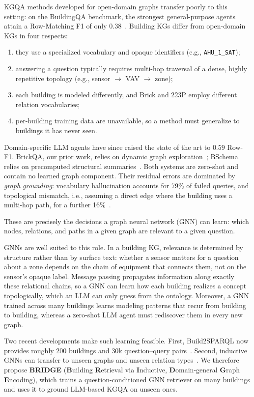 \documentclass[11pt]{article}
\newcommand{\code}[1]{\texttt{#1}}
\begin{document}
KGQA methods developed for open-domain graphs transfer poorly to this setting: on the BuildingQA benchmark, the strongest general-purpose agents attain a Row-Matching F1 of only $0.38$~\cite{mulayim2025buildingqa}. Building KGs differ from open-domain KGs in four respects:
\begin{enumerate}
  \item they use a specialized vocabulary and opaque identifiers (e.g., \code{AHU\_1\_SAT});
  \item answering a question typically requires multi-hop traversal of a dense, highly repetitive topology (e.g., sensor $\rightarrow$ VAV $\rightarrow$ zone);
  \item each building is modeled differently, and Brick and 223P employ different relation vocabularies;
  \item per-building training data are unavailable, so a method must generalize to buildings it has never seen.
\end{enumerate}

Domain-specific LLM agents have since raised the state of the art to $0.59$ Row-F1. BrickQA, our prior work, relies on dynamic graph exploration~\cite{ko2026brickqa}; BSchema relies on precomputed structural summaries~\cite{bschema2026}. Both systems are zero-shot and contain no learned graph component. Their residual errors are dominated by \emph{graph grounding}: vocabulary hallucination accounts for 79\% of failed queries, and topological mismatch, i.e., assuming a direct edge where the building uses a multi-hop path, for a further 16\%~\cite{bschema2026}.

These are precisely the decisions a graph neural network (GNN) can learn: which nodes, relations, and paths in a given graph are relevant to a given question.

GNNs are well suited to this role. In a building KG, relevance is determined by structure rather than by surface text: whether a sensor matters for a question about a zone depends on the chain of equipment that connects them, not on the sensor's opaque label. Message passing propagates information along exactly these relational chains, so a GNN can learn how each building realizes a concept topologically, which an LLM can only guess from the ontology. Moreover, a GNN trained across many buildings learns modeling patterns that recur from building to building, whereas a zero-shot LLM agent must rediscover them in every new graph.

Two recent developments make such learning feasible. First, Build2SPARQL now provides roughly 200 buildings and 30k question--query pairs~\cite{jung2026build2sparql}. Second, inductive GNNs can transfer to unseen graphs and unseen relation types~\cite{zhu2021nbfnet,galkin2024ultra}. We therefore propose \textbf{BRIDGE} (\textbf{B}uilding \textbf{R}etrieval via \textbf{I}nductive, \textbf{D}omain-general \textbf{G}raph \textbf{E}ncoding), which trains a question-conditioned GNN retriever on many buildings and uses it to ground LLM-based KGQA on unseen ones.
\end{document}
